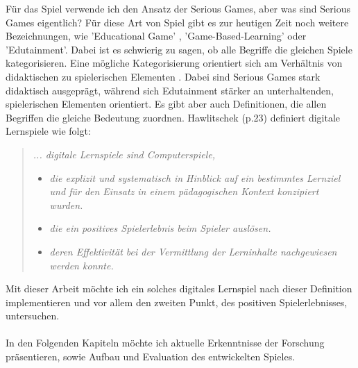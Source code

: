 Für das Spiel verwende ich den Ansatz der Serious Games, aber was sind Serious Games eigentlich? Für diese Art von Spiel gibt es zur heutigen Zeit noch weitere Bezeichnungen, wie 'Educational Game' , 'Game-Based-Learning' oder 'Edutainment'. Dabei ist es schwierig zu sagen, ob alle Begriffe die gleichen Spiele kategorisieren. Eine mögliche Kategorisierung orientiert sich am Verhältnis von didaktischen zu spielerischen Elementen \cite{Wechselberger2009}. Dabei sind Serious Games stark didaktisch ausgeprägt, während sich Edutainment stärker an unterhaltenden, spielerischen Elementen orientiert. Es gibt aber auch Definitionen, die allen Begriffen die gleiche Bedeutung zuordnen. Hawlitschek\cite{hawlitschek2013} (p.23) definiert digitale Lernspiele wie folgt:
\begin{quote}
\textit{... digitale Lernspiele sind Computerspiele,}
\begin{itemize}
\item \textit{die explizit und systematisch in Hinblick auf ein bestimmtes Lernziel und für den Einsatz in einem pädagogischen Kontext konzipiert wurden.}
\item \textit{die ein positives Spielerlebnis beim Spieler auslösen.}
\item \textit{deren Effektivität bei der Vermittlung der Lerninhalte nachgewiesen werden konnte.}
\end{itemize}
\end{quote}
Mit dieser Arbeit möchte ich ein solches digitales Lernspiel nach dieser Definition implementieren und vor allem den zweiten Punkt, des positiven Spielerlebnisses, untersuchen.\\
\\
In den Folgenden Kapiteln möchte ich aktuelle Erkenntnisse der Forschung präsentieren, sowie Aufbau und Evaluation des entwickelten Spieles.
